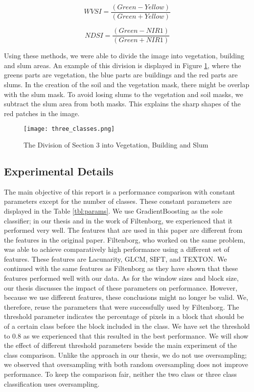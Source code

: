 \begin{equation}
\label{eq:wvsi}
WVSI = \frac{(Green - Yellow)}{(Green + Yellow)}
\end{equation}

\begin{equation}
\label{eq:ndsi}
NDSI = \frac{(Green - NIR1)}{(Green + NIR1)}
\end{equation}


Using these methods, we were able to divide the image into vegetation, building and slum areas. An example of this division is displayed in Figure \ref{fig:masks}, where the greens parts are vegetation, the blue parts are buildings and the red parts are slums. In the creation of the soil and the vegetation mask, there might be overlap with the slum mask. To avoid losing slums to the vegetation and soil masks, we subtract the slum area from both masks. This explains the sharp shapes of the red patches in the image.


\begin{figure}[h]
    \centering
    \texttt{[image: three\_classes.png]}
    \caption{The Division of Section 3 into Vegetation, Building and Slum}
    \label{fig:masks}
\end{figure}



\subsection{Experimental Details}
The main objective of this report is a performance comparison with constant parameters except for the number of classes. These constant parameters are displayed in the Table \ref{tbl:params}.
We use GradientBoosting as the sole classifier; in our thesis and in the work of Filtenborg, we experienced that it performed very well. The features that are used in this paper are different from the features in the original paper. Filtenborg, who worked on the same problem, was able to achieve comparatively high performance using a different set of features. These features are Lacunarity, GLCM, SIFT, and TEXTON. We continued with the same features as Filtenborg as they have shown that these features performed well with our data.
As for the window sizes and block size, our thesis discusses the impact of these parameters on performance. However, because we use different features, these conclusions might no longer be valid. We, therefore, reuse the parameters that were successfully used by Filtenborg.
The threshold parameter indicates the percentage of pixels in a block that should be of a certain class before the block included in the class. We have set the threshold to 0.8 as we experienced that this resulted in the best performance. We will show the effect of different threshold parameters beside the main experiment of the class comparison.
Unlike the approach in our thesis, we do not use oversampling; we observed that oversampling with both random oversampling does not improve performance. To keep the comparison fair, neither the two class or three class classification uses oversampling.


